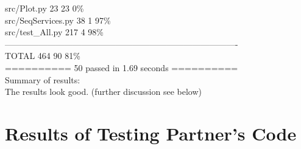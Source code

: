 \documentclass[12pt]{article}
\begin{document}
src/Plot.py            \hspace{24ex}              23\hspace{7ex}     23 \hspace{5ex}      0\%\\
src/SeqServices.py   \hspace{17ex}           38\hspace{8ex}      1\hspace{5ex}      97\%\\
src/test\_All.py        \hspace{20ex}           217\hspace{8ex}      4 \hspace{4ex}     98\%\\
----------------------------------------------------------------------------------\\
TOTAL           \hspace{27ex}                   464 \hspace{6ex}    90  \hspace{3ex}   81\%\\
========== 50 passed in 1.69 seconds ==========\\

Summary of results:\\
The results look good. (further discussion see below)\\


\section{Results of Testing Partner's Code}
\end{document}
